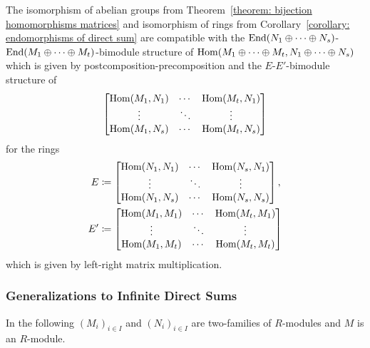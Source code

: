 \begin{proposition}
  The isomorphism of abelian groups from Theorem~\ref{theorem: bijection homomorphisms matrices} and isomorphism of rings from Corollary~\ref{corollary: endomorphisms of direct sum} are compatible with the $\operatorname{End}(N_1 \oplus \dotsb \oplus N_s)$-$\operatorname{End}(M_1 \oplus \dotsb \oplus M_t)$-bimodule structure of $\operatorname{Hom}(M_1 \oplus \dotsb \oplus M_t, N_1 \oplus \dotsb \oplus N_s)$ which is given by postcomposition-precomposition and the $E$-$E'$-bimodule structure of
  \[
    \begin{bmatrix}
      \operatorname{Hom}(M_1, N_1)  & \cdots  & \operatorname{Hom}(M_t, N_1)  \\
      \vdots          & \ddots  & \vdots          \\
      \operatorname{Hom}(M_1, N_s)  & \cdots  & \operatorname{Hom}(M_t, N_s)
    \end{bmatrix}
  \]
  for the rings
  \begin{align*}
              E
    &\coloneqq \begin{bmatrix}
                \operatorname{Hom}(N_1, N_1)  & \cdots  & \operatorname{Hom}(N_s, N_1)  \\
                \vdots          & \ddots  & \vdots          \\
                \operatorname{Hom}(N_1, N_s)  & \cdots  & \operatorname{Hom}(N_s, N_s)
              \end{bmatrix},
    \\
              E'
    &\coloneqq \begin{bmatrix}
                \operatorname{Hom}(M_1, M_1)  & \cdots  & \operatorname{Hom}(M_t, M_1)  \\
                \vdots          & \ddots  & \vdots          \\
                \operatorname{Hom}(M_1, M_t)  & \cdots  & \operatorname{Hom}(M_t, M_t)
              \end{bmatrix}
  \end{align*}
  which is given by left-right matrix multiplication.
\end{proposition}





\subsubsection{Generalizations to Infinite Direct Sums}


\begin{conventions}
  In the following $(M_i)_{i \in I}$ and $(N_i)_{i \in I}$ are two-families of $R$-modules and $M$ is an $R$-module.
\end{conventions}


